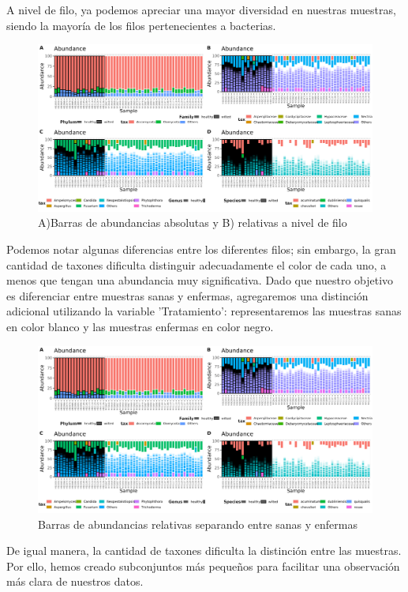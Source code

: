 A nivel de filo, ya podemos apreciar una mayor diversidad en nuestras muestras, siendo la mayoría de los filos pertenecientes a bacterias.\\
\begin{figure}[h]
\centering
\includegraphics[width=\textwidth]{Img/cap2/Barras_Eukarya10.png}
\caption{A)Barras de abundancias absolutas y B) relativas a nivel de filo}
\end{figure}
Podemos notar algunas diferencias entre los diferentes filos; sin embargo, la gran cantidad de taxones dificulta distinguir adecuadamente el color de cada uno, a menos que tengan una abundancia muy significativa. Dado que nuestro objetivo es diferenciar entre muestras sanas y enfermas, agregaremos una distinción adicional utilizando la variable 'Tratamiento': representaremos las muestras sanas en color blanco y las muestras enfermas en color negro.\\
\begin{figure}[h]
\centering
\includegraphics[width=\textwidth]{Img/cap2/Barras_Eukarya10.png}
\caption{Barras de abundancias relativas separando entre sanas y enfermas}
\end{figure}
De igual manera, la cantidad de taxones dificulta la distinción entre las muestras. Por ello, hemos creado subconjuntos más pequeños para facilitar una observación más clara de nuestros datos.\\

